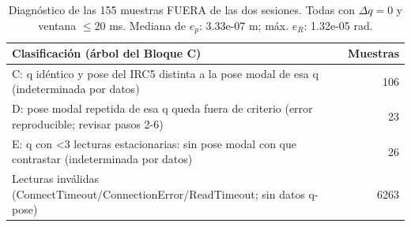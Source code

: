 \begin{table}[htbp]
\centering
\scriptsize
\setlength{\tabcolsep}{3pt}
\renewcommand{\arraystretch}{1.15}
\caption{Diagnóstico de las 155 muestras FUERA de las dos sesiones. Todas con $\Delta q=0$ y ventana $\le20$ ms. Mediana de $e_p$: 3.33e-07 m; máx. $e_R$: 1.32e-05 rad.}
\label{tab:fuera}
\begin{tabular}{p{11cm}r}
\toprule
\textbf{Clasificación (árbol del Bloque C)} & \textbf{Muestras} \\
\midrule
C: q id\'entico y pose del IRC5 distinta a la pose modal de esa q (indeterminada por datos) & 106 \\
D: pose modal repetida de esa q queda fuera de criterio (error reproducible; revisar pasos 2-6) & 23 \\
E: q con <3 lecturas estacionarias: sin pose modal con que contrastar (indeterminada por datos) & 26 \\
Lecturas inv\'alidas (ConnectTimeout/ConnectionError/ReadTimeout; sin datos q-pose) & 6263 \\
\bottomrule
\end{tabular}
\end{table}
